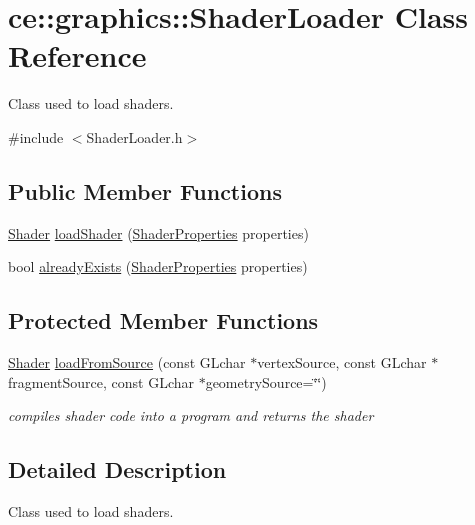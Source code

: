 \hypertarget{classce_1_1graphics_1_1_shader_loader}{}\section{ce\+:\+:graphics\+:\+:Shader\+Loader Class Reference}
\label{classce_1_1graphics_1_1_shader_loader}


Class used to load shaders.  




{\ttfamily \#include $<$Shader\+Loader.\+h$>$}

\subsection*{Public Member Functions}
\begin{DoxyCompactItemize}
\item 
\hyperlink{classce_1_1graphics_1_1_shader}{Shader} \hyperlink{classce_1_1graphics_1_1_shader_loader_a5b95b180861913b268f220be72be9869}{load\+Shader} (\hyperlink{structce_1_1graphics_1_1_shader_properties}{Shader\+Properties} properties)
\item 
bool \hyperlink{classce_1_1graphics_1_1_shader_loader_ae01c71a34d77e36b5aafc142214c6595}{already\+Exists} (\hyperlink{structce_1_1graphics_1_1_shader_properties}{Shader\+Properties} properties)
\end{DoxyCompactItemize}
\subsection*{Protected Member Functions}
\begin{DoxyCompactItemize}
\item 
\hyperlink{classce_1_1graphics_1_1_shader}{Shader} \hyperlink{classce_1_1graphics_1_1_shader_loader_a310a1f7e9478516bc85d03c4a08e6b21}{load\+From\+Source} (const G\+Lchar $\ast$vertex\+Source, const G\+Lchar $\ast$fragment\+Source, const G\+Lchar $\ast$geometry\+Source=\char`\"{}\char`\"{})
\begin{DoxyCompactList}\small\item\em compiles shader code into a program and returns the shader \end{DoxyCompactList}\end{DoxyCompactItemize}


\subsection{Detailed Description}
Class used to load shaders. 

